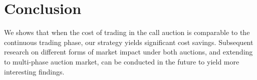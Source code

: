 \section{Conclusion}\label{secConclusionAuction}
We shows that when the cost of trading in the call auction is comparable to the continuous trading phase, our strategy yields significant cost savings. Subsequent research on different forms of market impact under both auctions, and extending to multi-phase auction market, can be conducted in the future to yield more interesting findings.
